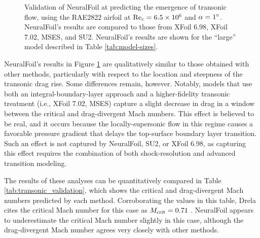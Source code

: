 \documentclass[journal]{new-aiaa}
\begin{document}
\begin{figure}[H]
    \centering
    
    \caption{Validation of NeuralFoil at predicting the emergence of transonic flow, using the RAE2822 airfoil at $\rm Re_c=6.5 \times 10^6$ and $\alpha=1\degree$. NeuralFoil's results are compared to those from XFoil 6.98, XFoil 7.02, MSES, and SU2. NeuralFoil's results are shown for the ``large'' model described in Table \ref{tab:model-sizes}.}
    \label{fig:transonic_validation}
\end{figure}

NeuralFoil's results in Figure \ref{fig:transonic_validation} are qualitatively similar to those obtained with other methods, particularly with respect to the location and steepness of the transonic drag rise. Some differences remain, however. Notably, models that use both an integral-boundary-layer approach and a higher-fidelity transonic treatment (i.e., XFoil 7.02, MSES) capture a slight decrease in drag in a window between the critical and drag-divergent Mach numbers. This effect is believed to be real, and it occurs because the locally-supersonic flow in this regime causes a favorable pressure gradient that delays the top-surface boundary layer transition. Such an effect is not captured by NeuralFoil, SU2, or XFoil 6.98, as capturing this effect requires the combination of both shock-resolution and advanced transition modeling.

The results of these analyses can be quantitatively compared in Table \ref{tab:transonic_validation}, which shows the critical and drag-divergent Mach numbers predicted by each method. Corroborating the values in this table, Drela cites the critical Mach number for this case as $M_{\rm crit}=0.71$ \cite{drelaFlightVehicleAerodynamics2013}. NeuralFoil appears to underestimate the critical Mach number slightly in this case, although the drag-divergent Mach number agrees very closely with other methods.
\end{document}
